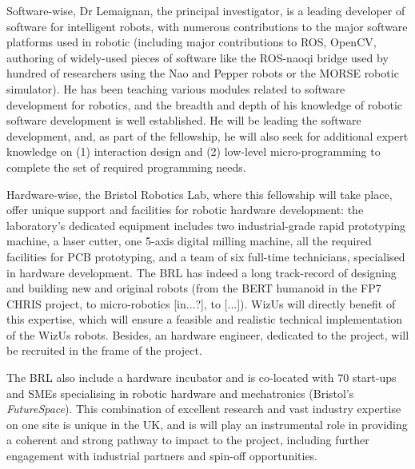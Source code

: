 \documentclass[11pt]{article}
\newcommand{\project}{WizUs\xspace}
\begin{document}
Software-wise, Dr Lemaignan, the principal investigator, is a leading
developer of software for intelligent robots, with numerous contributions to
the major software platforms used in robotic (including major contributions to
ROS, OpenCV, authoring of widely-used pieces of software like the ROS-naoqi
bridge used by hundred of researchers using the Nao and Pepper robots or the
MORSE robotic simulator). He has been teaching various modules related to
software development for robotics, and the breadth and depth of his knowledge of
robotic software development is well established. He will be leading the
software development, and, as part of the fellowship, he will also seek for
additional expert knowledge on (1) interaction design and (2) low-level
micro-programming to complete the set of required programming needs.

Hardware-wise, the Bristol Robotics Lab, where this fellowship will take place,
offer unique support and facilities for robotic hardware development: the
laboratory's dedicated equipment includes two industrial-grade rapid prototyping
machine, a laser cutter, one 5-axis digital milling machine, all the required
facilities for PCB prototyping, and a team of six full-time technicians,
specialised in hardware development. The BRL has indeed a long track-record of
designing and building new and original robots (from the BERT humanoid in the
FP7 CHRIS project, to micro-robotics [in...?], to [...]). \project will directly
benefit of this expertise, which will ensure a feasible and realistic technical
implementation of the \project robots. Besides, an hardware engineer, dedicated
to the project, will be recruited in the frame of the project.

The BRL also include a hardware incubator and is co-located with 70 start-ups
and SMEs specialising in robotic hardware and mechatronics (Bristol's
\emph{FutureSpace}). This combination of excellent research and vast industry
expertise on one site is unique in the UK, and is will play an instrumental role
in providing a coherent and strong pathway to impact to the project, including
further engagement with industrial partners and spin-off opportunities.



\newpage

\printbibliography




\end{document}
